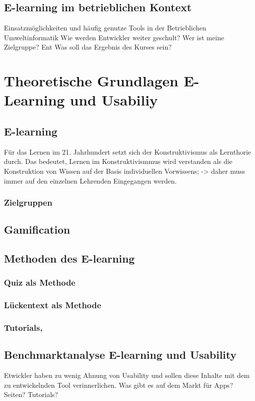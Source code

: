 \documentclass[a4paper, 12pt, twoside, BCOR=20mm, DIV=calc, abstracton, parskip=half*, toc=bibliography, toc=listof, headsepline, headings=small, numbers=enddot]{scrreprt} %
\begin{document}
\section{E-learning im betrieblichen Kontext}
Einsatzmöglichkeiten und häufig genutze Tools in der Betrieblichen Umweltinformatik 
Wie werden Entwickler weiter geschult?
Wer ist meine Zielgruppe?  Ent
Was soll das Ergebnis des Kurses sein?

\chapter{Theoretische Grundlagen E-Learning und Usabiliy}
\section{E-learning}
Für das Lernen im 21. Jahrhundert setzt sich der Konstruktivismus als Lernthorie durch. Das bedeutet, Lernen im Konstruktivismmus wird verstanden als die Konstruktion von Wissen auf der Basis individuellen Vorwissens; -> daher muss immer auf den einzelnen Lehrenden Eingegangen werden. \cite[S.8]{1}
\subsection{Zielgruppen}
\section{Gamification}
\section{Methoden des E-learning}
\subsection{Quiz als Methode}
\subsection{Lückentext als Methode}
\subsection{Tutorials, }
\section{Benchmarktanalyse E-learning und Usability}
Etwickler haben zu wenig Ahnung von Usability und sollen diese Inhalte mit dem zu entwickelnden Tool verinnerlichen. 
Was gibt es auf dem Markt für Apps? Seiten? Tutorials? 
\end{document}
